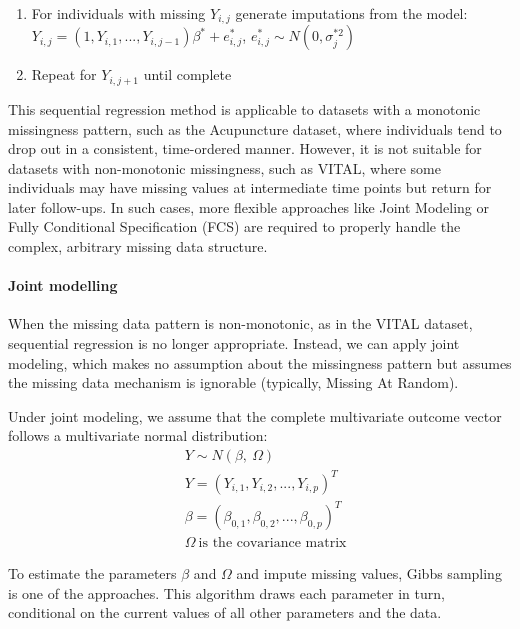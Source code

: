 \documentclass{article}
\begin{document}
\begin{enumerate}
\def\labelenumi{\arabic{enumi}.}
\setcounter{enumi}{3}
\item
  For individuals with missing \(Y_{i,j}\) generate imputations from the
  model:
  \(Y_{i,j} = (1,Y_{i,1},...,Y_{i,j-1}) \beta^{*} + e^{*}_{i,j}\),
  \(e_{i,j}^{*} \sim{N} (0,\sigma^{*2}_{j})\)
\item
  Repeat for \(Y_{i,j+1}\) until complete
\end{enumerate}

This sequential regression method is applicable to datasets with a
monotonic missingness pattern, such as the Acupuncture dataset, where
individuals tend to drop out in a consistent, time-ordered manner.
However, it is not suitable for datasets with non-monotonic missingness,
such as VITAL, where some individuals may have missing values at
intermediate time points but return for later follow-ups. In such cases,
more flexible approaches like Joint Modeling or Fully Conditional
Specification (FCS) are required to properly handle the complex,
arbitrary missing data structure.

\paragraph{Joint modelling}\label{joint-modelling}

When the missing data pattern is non-monotonic, as in the VITAL dataset,
sequential regression is no longer appropriate. Instead, we can apply
joint modeling, which makes no assumption about the missingness pattern
but assumes the missing data mechanism is ignorable (typically, Missing
At Random).

Under joint modeling, we assume that the complete multivariate outcome
vector follows a multivariate normal distribution: \begin{align*}
    & Y \sim N(\beta,\ \Omega) \\
    & Y = (Y_{i,1},Y_{i,2},...,Y_{i,p})^{T} \\
    & \beta = (\beta_{0,1},\beta_{0,2},...,\beta_{0,p})^{T} \\
    & \Omega \ \text{is the covariance matrix}
    \end{align*}

To estimate the parameters \(\beta\) and \(\Omega\) and impute missing
values, Gibbs sampling is one of the approaches. This algorithm draws
each parameter in turn, conditional on the current values of all other
parameters and the data.
\end{document}
